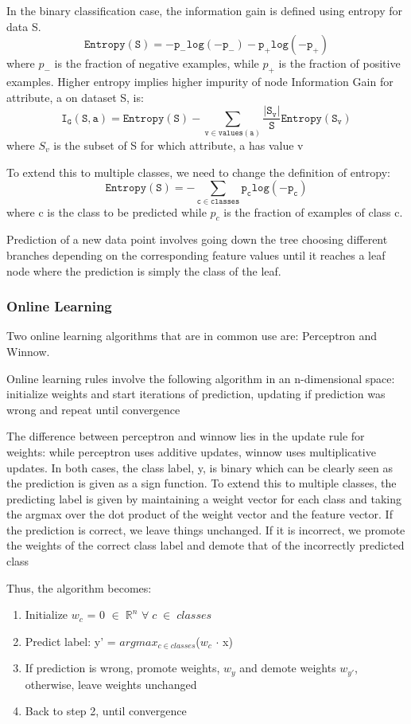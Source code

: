 \documentclass[letterpaper, 11 pt, conference]{IEEEtran}  %
\begin{document}
In the binary classification case, the information gain is defined using entropy for data S.
$$\mathtt{Entropy (S) = -p_-log(-p_-)-p_+log(-p_+)}$$ where $p_-$ is the fraction of negative examples, while $p_+$ is the fraction of positive examples. Higher entropy implies higher impurity of node \newline
Information Gain for attribute, a on dataset S, is:
$$\mathtt{I_G (S,a) = Entropy(S) - \sum_{v\in values(a)} \frac{|S_v|}{S} Entropy(S_v)}$$
where $S_v$ is the subset of S for which attribute, a has value v

To extend this to multiple classes, we need to change the definition of entropy:
$$\mathtt{Entropy(S) = -\sum_{c\in classes}p_c log(-p_c)}$$ where c is the class to be predicted while $p_c$ is the fraction of examples of class c.

Prediction of a new data point involves going down the tree choosing different branches depending on the corresponding feature values until it reaches a leaf node where the prediction is simply the class of the leaf.

\subsubsection{\textbf{Online Learning}}
Two online learning algorithms that are in common use are: Perceptron and Winnow.

Online learning rules involve the following algorithm in an n-dimensional space: initialize weights and start iterations of prediction, updating if prediction was wrong and repeat until convergence

The difference between perceptron and winnow lies in the update rule for weights: while perceptron uses additive updates, winnow uses multiplicative updates. In both cases, the class label, y, is binary which can be clearly seen as the prediction is given as a sign function. To extend this to multiple classes, the predicting label is given by maintaining a weight vector for each class and taking the argmax over the dot product of the weight vector and the feature vector. If the prediction is correct, we leave things unchanged. If it is incorrect, we promote the weights of the correct class label and demote that of the incorrectly predicted class

Thus, the algorithm becomes: 
\begin{center}
	\begin{enumerate}
		\item Initialize $w_c$ = 0 $\in \; \mathbb{R}^n$ $\forall\;c\;\in\;classes$
		\item Predict label: y' = $argmax_{c \in classes}$($w_c$ $\cdot$ x)
		\item If prediction is wrong, promote weights, $w_y$ and demote weights $w_{y'}$, otherwise, leave weights unchanged
		\item Back to step 2, until convergence
	\end{enumerate}
\end{center}
\end{document}
